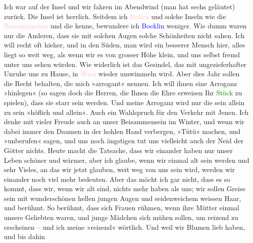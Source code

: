            \pstart
           Ich war auf der Insel und wir fahren im Abendwind (man hat sechs geläutet) zurück.
               Die Insel ist herrlich. Seitdem ich \textcolor{pink}{Italien}{}\ledrightnote{\textcolor{pink}{Italien}} und
               solche Inseln wie die \textcolor{pink}{Borromäischen}{}\ledrightnote{\textcolor{pink}{Borromäische Inseln}} und die kenne,
               bewundere ich \textcolor{blue}{Boeklin}{}\ledrightnote{\textcolor{blue}{Arnold Böcklin}} weniger. Wie dumm waren nur
               die Anderen, dass sie mit solchen Augen solche Schönheiten nicht sahen. Ich will
               recht oft hieher, und in den Süden, man wird ein besserer Mensch hier, alles liegt so
               weit weg, als wenn wir es von grosser Höhe klein, und uns selbst fremd unter uns
               sehen würden. {\pb}Wie widerlich ist das Gesindel, das mit
               ungezieferhafter Unruhe uns zu Hause, in \textcolor{pink}{Wien}{}\ledrightnote{\textcolor{pink}{Wien}} wieder
               umwimmeln wird. Aber dies Jahr sollen die Recht behalten, die mich »arrogant« nennen.
               Ich will ihnen eine Arroganz »hinlegen« (so sagen doch die Herren, die Ihnen die Ehre
               erweisen Ihr \textcolor{green}{Stück}{} zu spielen),
               dass sie starr sein werden. Und meine Arroganz wird nur die sein allein zu sein
               »höflich und allein«. Auch ein Wahlspruch für den Verkehr mit Jenen. Ich denke mit
               vieler Freude auch an unser Beisammensein im Winter, und wenn wir dabei immer den
               Daumen in der hohlen Hand verbergen, »Tütü« machen, und »unberufen« sagen, und uns
               noch ängstigen tut uns vielleicht auch der Neid der Götter nichts. Heute macht die
               Tatsache, dass wir einander haben nur unser Leben schöner und wärmer, aber ich
               glaube, wenn wir einmal alt sein werden und sehr Vieles, an das wir jetzt glauben,
               weit weg von uns sein wird, werden wir einander noch viel mehr bedeuten. Aber das
               möcht ich gar nicht, dass es so kommt, {\pb}dass wir, wenn
               wir alt sind, nichts mehr haben als uns; wir sollen Greise sein mit wunderschönen
               hellen jungen Augen und seidenweichem weissen Haar, und  berühmt. So berühmt, dass sich Frauen rühmen, wenn ihre Mütter einmal
               unsere Geliebten waren, und junge Mädchen sich mühen sollen, um reizend zu erscheinen
               – und ich meine »reizend« wörtlich. Und weil wir Blumen lieb haben, und bis dahin
